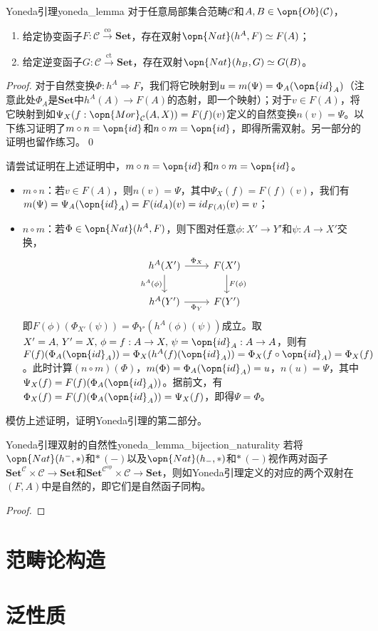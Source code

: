 \documentclass[../main.tex]{subfiles}
\begin{document}
\begin{theorem}{Yoneda引理}{yoneda_lemma}
对于任意局部集合范畴$\mathcal{C}$和$A,B\in\opn{Ob}(\mathcal{C})$，
\begin{enumerate}
\item 给定协变函子$F:\mathcal{C}\overset{\text{co}}{\to}\mathbf{Set}$，存在双射$\opn{Nat}(h^A,F)\simeq F(A)$；
\item 给定逆变函子$G:\mathcal{C}\overset{\text{ct}}{\to}\mathbf{Set}$，存在双射$\opn{Nat}(h_B,G)\simeq G(B)$。
\end{enumerate}
\end{theorem}
\begin{proof}
对于自然变换$\Phi:h^A\Rightarrow F$，我们将它映射到$u=m(\Psi)=\Phi_A(\opn{id}_A)$（注意此处$\Phi_A$是$\mathbf{Set}$中$h^A(A)\to F(A)$的态射，即一个映射）；对于$v\in F(A)$，将它映射到如$\Psi_X(f:\opn{Mor}_\mathcal{C}(A,X))=F(f)(v)$定义的自然变换$n(v)=\Psi$。以下练习证明了$m\circ n=\opn{id}$和$n\circ m=\opn{id}$，即得所需双射。另一部分的证明也留作练习。\qed
\end{proof}
\begin{exercise}
请尝试证明在上述证明中，$m\circ n=\opn{id}$和$n\circ m=\opn{id}$。
\end{exercise}
\begin{solution}
\begin{itemize}
\item $m\circ n$：若$v\in F(A)$，则$n(v)=\Psi$，其中$\Psi_X(f)=F(f)(v)$，我们有$m(\Psi)=\Psi_A(\opn{id}_A)=F(id_A)(v)=id_{F(A)}(v)=v$；
\item $n\circ m$：若$\Phi\in\opn{Nat}(h^A,F)$，则下图对任意$\phi:X'\to Y'$和$\psi:A\to X'$交换，
$$
\begin{tikzcd}
    h^A(X') \arrow[r, "\Phi_X"] \arrow[d, "h^A(\phi)"'] & F(X') \arrow[d, "F(\phi)"] \\
    h^A(Y') \arrow[r, "\Phi_Y"']                        & F(Y')                     
\end{tikzcd}
$$
即$F(\phi)(\Phi_{X'}(\psi))=\Phi_{Y'}(h^A(\phi)(\psi))$成立。取$X'=A,\,Y'=X,\,\phi=f:A\to X,\,\psi=\opn{id}_A:A\to A$，则有$F(f)(\Phi_A(\opn{id}_A))=\Phi_X(h^A(f)(\opn{id}_A))=\Phi_X(f\circ\opn{id}_A)=\Phi_X(f)$。此时计算$(n\circ m)(\Phi)$，$m(\Phi)=\Phi_A(\opn{id}_A)=u$，$n(u)=\Psi$，其中$\Psi_X(f)=F(f)(\Phi_A(\opn{id}_A))$。据前文，有$\Phi_X(f)=F(f)(\Phi_A(\opn{id}_A))=\Psi_X(f)$，即得$\Psi=\Phi$。
\end{itemize}
\end{solution}
\begin{exercise}
模仿上述证明，证明Yoneda引理的第二部分。
\end{exercise}
\begin{corollary}{Yoneda引理双射的自然性}{yoneda_lemma_bijection_naturality}
若将$\opn{Nat}(h^-,*)$和$*\,(-)$以及$\opn{Nat}(h_-,*)$和$*\,(-)$视作两对函子$\mathbf{Set}^\mathcal{C}\times\mathcal{C}\to\mathbf{Set}$和$\mathbf{Set}^{\mathcal{C}^\text{op}}\times\mathcal{C}\to\mathbf{Set}$，则如Yoneda引理定义的对应的两个双射在$(F,A)$中是自然的，即它们是自然函子同构。
\end{corollary}
\begin{proof}

\end{proof}

\section{范畴论构造}
\section{泛性质}
\biblio
\end{document}
